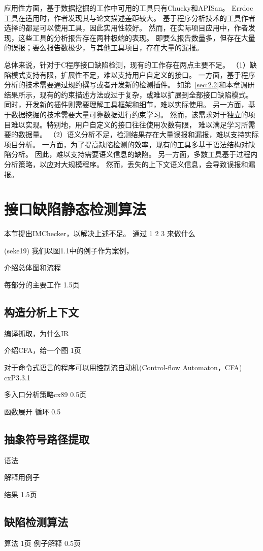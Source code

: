 应用性方面，基于数据挖掘的工作中可用的工具只有Chucky和APISan。
Errdoc工具在适用时，作者发现其与论文描述差距较大。
基于程序分析技术的工具作者选择的都是可以使用工具，因此实用性较好。
然而，在实际项目应用中，作者发现，这些工具的分析报告存在两种极端的表现。
即要么报告数量多，但存在大量的误报；要么报告数极少，与其他工具项目，存在大量的漏报。

总体来说，针对于C程序接口缺陷检测，现有的工作存在两点主要不足。
（1）缺陷模式支持有限，扩展性不足，难以支持用户自定义的接口。
一方面，基于程序分析的技术需要通过规约撰写或者开发新的检测插件。
如第~\ref{sec:2.2}和本章调研结果所示，现有的约束描述方法或过于复杂，或难以扩展到全部接口缺陷模式。
同时，开发新的插件则需要理解工具框架和细节，难以实际使用。
另一方面，基于数据挖掘的技术需要大量可靠数据进行约束学习。
然而，该需求对于独立的项目难以实现。特别地，用户自定义的接口往往使用次数有限，
难以满足学习所需要的数据量。
（2）语义分析不足，检测结果存在大量误报和漏报，难以支持实际项目分析。
一方面，为了提高缺陷检测的效率，现有的工具多基于语法结构对缺陷分析。
因此，难以支持需要语义信息的缺陷。
另一方面，多数工具基于过程内分析策略，以应对大规模程序。
然而，丢失的上下文语义信息，会导致误报和漏报。

\section{接口缺陷静态检测算法}
\label{sec:3.3}
本节提出IMChecker，以解决上述不足。
通过 1 2 3 来做什么


(seke19)
我们以图1.1中的例子作为案例，

介绍总体图和流程

每部分的主要工作
1.5页

\subsection{构造分析上下文}
编译抓取，为什么IR

介绍CFA，给一个图
1页

对于命令式语言的程序可以用控制流自动机(Control-flow Automaton，CFA) cxP3.3.1

多入口分析策略cx89
0.5页

函数展开
循环
0.5

\subsection{抽象符号路径提取}
语法

解释用例子

结果
1.5页
\subsection{缺陷检测算法}
算法
1页
例子解释
0.5页

